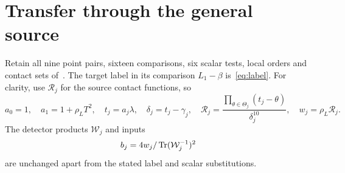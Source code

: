 \documentclass[11pt,a4paper]{article}
\begin{document}
\section{Transfer through the general source}
Retain all nine point pairs, sixteen comparisons, six scalar tests,
local orders and contact sets of~\cite{UnitNorm}. The target label
in its comparison $L_1-\beta$ is~\eqref{eq:label}. For clarity, use
$\mathcal R_j$ for the source contact functions, so
\[
 a_0=1,\quad a_1=1+\rho_LT^2,\quad t_j=a_j\lambda,
 \quad\delta_j=t_j-\gamma_j,\quad
 \mathcal R_j=\frac{\prod_{\theta\in\Theta_j}(t_j-\theta)}
                         {\delta_j^{10}},\quad w_j=\rho_L\mathcal R_j.
\]
The detector products $\mathcal W_j$ and inputs
\[
                         b_j=4w_j/\operatorname{Tr}(\mathcal W_j^{-1})^2
\]
are unchanged apart from the stated label and scalar substitutions.
\end{document}
